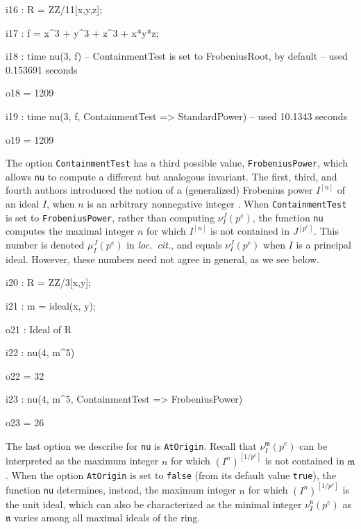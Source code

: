 \documentclass{amsart}
\newcommand{\idealm}{\mathfrak{m}}
\begin{document}
\smallskip
{\small
{}
\begin{MyVerbatim}
i16 : R = ZZ/11[x,y,z];

i17 : f = x^3 + y^3 + z^3 + x*y*z;

i18 : time nu(3, f) -- ContainmentTest is set to FrobeniusRoot, by default
     -- used 0.153691 seconds

o18 = 1209

i19 : time nu(3, f, ContainmentTest => StandardPower)
     -- used 10.1343 seconds

o19 = 1209
\end{MyVerbatim}
}

The option \texttt{ContainmentTest} has a third possible value, \texttt{FrobeniusPower}, which allows \texttt{nu} to compute a different but analogous invariant.
The first, third, and fourth authors introduced the notion of a (generalized) Frobenius power $I^{[n]}$ of an ideal $I$, when $n$ is an arbitrary nonnegative integer \cite{hernandez+etal.frobenius_powers}.
When \texttt{ContainmentTest} is set to \texttt{FrobeniusPower}, rather than  computing $\nu_I^J(p^e)$, the function \texttt{nu} computes the maximal integer $n$ for which $I^{[n]}$ is not contained in $J^{[p^e]}$.  This number is denoted $\mu_I^J(p^e)$ in \emph{loc.~cit.}, and equals $\nu_I^J(p^e)$ when $I$ is a principal ideal.
However, these numbers need not agree in general, as we see below.

\smallskip
{\small
{}
\begin{MyVerbatim}
i20 : R = ZZ/3[x,y];

i21 : m = ideal(x, y);

o21 : Ideal of R

i22 : nu(4, m^5)

o22 = 32

i23 : nu(4, m^5, ContainmentTest => FrobeniusPower)

o23 = 26
\end{MyVerbatim}
}
\smallskip

The last option we describe for \texttt{nu} is \texttt{AtOrigin}.
Recall that $\nu_I^\idealm(p^e)$ can be interpreted as the maximum integer $n$ for which $(I^n)^{[1/p^e]}$ is not contained in $\idealm$. 
When the option \texttt{AtOrigin} is set to \texttt{false} (from its default value \texttt{true}), the function \texttt{nu} determines, instead, the maximum integer $n$ for which $(I^n)^{[1/p^e]}$ is the unit ideal, which can also be characterized as the minimal integer $\nu_I^\mathfrak{n}(p^e)$ as $\mathfrak{n}$ varies among all maximal ideals of the ring.  
\end{document}
